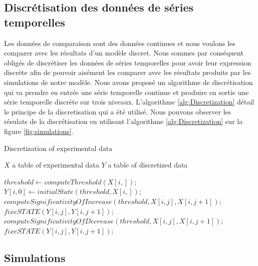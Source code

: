 \subsection{Discrétisation des données de séries temporelles}\label{sec:discretisation}
Les données de comparaison sont des données continues et nous voulons les comparer avec les résultats d'un modèle discret. Nous sommes par conséquent 
obligés de discrétiser les données de séries temporelles  pour avoir leur expression discrète afin de pouvoir aisément les comparer avec les résultats 
produits par les simulations de notre modèle.
Nous avons proposé un algorithme de discrétisation qui va prendre en entrée une série temporelle continue et  produire en sortie une série temporelle
discrète sur trois niveaux. L'algorithme \ref{alg:Discretization} détail le principe de la discretisation qui a été utilisé. Nous pouvons observer les résulats 
de la discrétisation en utilisant l'algorithme \ref{alg:Discretization} sur la figure \ref{fig:simulations}.
\begin{algorithm}
\caption{Discretization of experimental data}
\label{alg:Discretization}
\begin{algorithmic}
\REQUIRE $X$ a table of experimental data
\ENSURE $Y$ a table of discretized data

\STATE $threshold \leftarrow computeThreshold(X[i,]);$
\STATE $Y[i,0] \leftarrow initialState(threshold,X[i,]);$
   \STATE $computeSignificativityOfIncrease(threshold,X[i,j],X[i,j+1]);$
   \STATE $fixeSTATE(Y[i,j],Y[i,j+1]);$
  \ELSE
   \STATE $computeSignificativityOfDecrease(threshold,X[i,j],X[i,j+1]);$
   \STATE $fixeSTATE(Y[i,j],Y[i,j+1]);$
  \ENDIF
\ENDFOR

\ENDFOR

\end{algorithmic}
\end{algorithm}

\subsection{Simulations}\label{sec:simulations}

